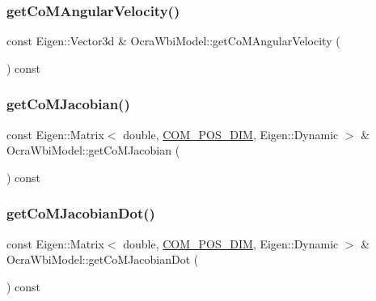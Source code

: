 \subsubsection{\texorpdfstring{get\+Co\+M\+Angular\+Velocity()}{getCoMAngularVelocity()}}
{\footnotesize\ttfamily const Eigen\+::\+Vector3d \& Ocra\+Wbi\+Model\+::get\+Co\+M\+Angular\+Velocity (\begin{DoxyParamCaption}{ }\end{DoxyParamCaption}) const\hspace{0.3cm}{\ttfamily [virtual]}}

\hypertarget{classocra__icub_1_1OcraWbiModel_afc4580224117e18bcbed51a478da22f4}{}\label{classocra__icub_1_1OcraWbiModel_afc4580224117e18bcbed51a478da22f4} 
\subsubsection{\texorpdfstring{get\+Co\+M\+Jacobian()}{getCoMJacobian()}}
{\footnotesize\ttfamily const Eigen\+::\+Matrix$<$ double, \hyperlink{OcraWbiModel_8cpp_a72cb22de2538ae949cc73fa3d7c33bdc}{C\+O\+M\+\_\+\+P\+O\+S\+\_\+\+D\+IM}, Eigen\+::\+Dynamic $>$ \& Ocra\+Wbi\+Model\+::get\+Co\+M\+Jacobian (\begin{DoxyParamCaption}{ }\end{DoxyParamCaption}) const\hspace{0.3cm}{\ttfamily [virtual]}}

\hypertarget{classocra__icub_1_1OcraWbiModel_a216eae4ac21f869688b8eaf88e05b99b}{}\label{classocra__icub_1_1OcraWbiModel_a216eae4ac21f869688b8eaf88e05b99b} 
\subsubsection{\texorpdfstring{get\+Co\+M\+Jacobian\+Dot()}{getCoMJacobianDot()}}
{\footnotesize\ttfamily const Eigen\+::\+Matrix$<$ double, \hyperlink{OcraWbiModel_8cpp_a72cb22de2538ae949cc73fa3d7c33bdc}{C\+O\+M\+\_\+\+P\+O\+S\+\_\+\+D\+IM}, Eigen\+::\+Dynamic $>$ \& Ocra\+Wbi\+Model\+::get\+Co\+M\+Jacobian\+Dot (\begin{DoxyParamCaption}{ }\end{DoxyParamCaption}) const\hspace{0.3cm}{\ttfamily [virtual]}}


